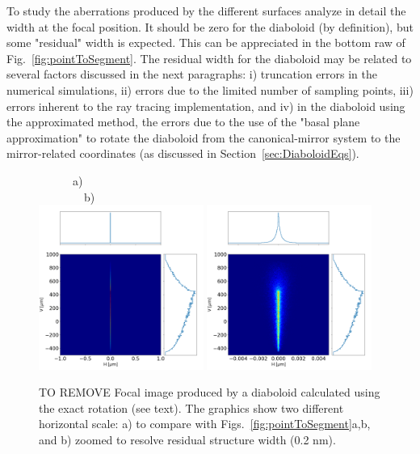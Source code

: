 \documentclass{iucr}              %
\newcommand{\inred}[1]{{\color{red}#1}}
\begin{document}
To study the aberrations produced by the different surfaces analyze in detail the width at the focal position. It should be zero for the diaboloid (by definition), but some "residual" width is expected. This can be appreciated in the bottom raw of Fig.~\ref{fig:pointToSegment}. The residual width for the diaboloid may be related to several factors discussed in the next paragraphs: i) truncation errors in the numerical simulations, ii) errors due to the limited number of sampling points, \inred{iii) errors inherent to the ray tracing implementation, and iv) in the diaboloid using the approximated method, the errors due to the use of the "basal plane approximation" to rotate the diaboloid from the canonical-mirror system to the mirror-related coordinates (as discussed in Section~\ref{sec:DiaboloidEqs}).}

\begin{figure}\label{fig:mathematica}
\flushleft
~~~~~~a)~~~~~~~~~~~~~~~~~~~~~~~~~~~~~~~~~~~~~~~~~~~~~~~~~~~~~~~~~~~~b)\\
\centering
\includegraphics[width=0.48\textwidth]{figures/p2s_mathematica1.png}
\includegraphics[width=0.48\textwidth]{figures/p2s_matematica2.png}
\caption{\inred{TO REMOVE} Focal image produced by a diaboloid calculated using the exact rotation (see text). The graphics show two different horizontal scale: a) to compare with Figs.~\ref{fig:pointToSegment}a,b, and b) zoomed to resolve residual structure width (0.2 nm).
}
\end{figure}
\end{document}
